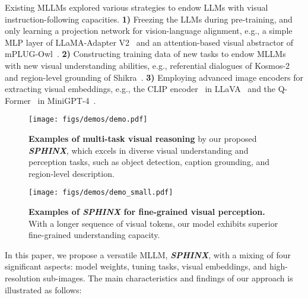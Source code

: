 \documentclass{article} \usepackage{iclr2024_conference,times}
\begin{document}
Existing MLLMs explored various strategies to endow LLMs with visual instruction-following capacities.
\textbf{1)} Freezing the LLMs during pre-training, and only learning a projection network for vision-language alignment, e.g., a simple MLP layer of LLaMA-Adapter V2~\citep{gao2023llama} and an attention-based visual abstractor of mPLUG-Owl~\citep{ye2023mplug}.
\textbf{2)} Constructing training data of new tasks to endow MLLMs with new visual understanding abilities, e.g., referential dialogues of Kosmos-2~\citep{peng2023kosmos} and region-level grounding of Shikra~\citep{chen2023shikra}.
\textbf{3)} Employing advanced image encoders for extracting visual embeddings, e.g., the CLIP encoder~\citep{radford2021learning} in LLaVA~\citep{liu2023visual} and the Q-Former~\citep{li2023blip} in MiniGPT-4~\citep{zhu2023minigpt}.
\begin{figure}[http]
    \centering
    \texttt{[image: figs/demos/demo.pdf]}
    \caption{\textbf{Examples of multi-task visual reasoning} by our proposed \textcolor{Goldenrod3}{\textbf{\textit{SPHINX}}}, which excels in diverse visual understanding and perception tasks, such as object detection, caption grounding, and region-level description.}
    \label{fig:demo1}
\end{figure}

\begin{figure}[http]
    \centering
    \texttt{[image: figs/demos/demo\_small.pdf]}
    \caption{\textbf{Examples of \textcolor{Goldenrod3}{\textbf{\textit{SPHINX}}} for fine-grained visual perception.} With a longer sequence of visual tokens, our model exhibits superior fine-grained understanding capacity.
    }
    \label{fig:demo2}
\end{figure}

In this paper, we propose a versatile MLLM, \textcolor{Goldenrod3}{\textbf{\textit{SPHINX}}}, with a mixing of four significant aspects: model weights, tuning tasks, visual embeddings, and high-resolution sub-images. The main characteristics and findings of our approach is illustrated as follows:
\end{document}
